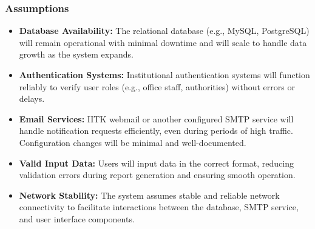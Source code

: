 \documentclass[a4paper,12pt]{article}
\begin{document}
\subsubsection{Assumptions}
    \begin{itemize}
        \item \textbf{Database Availability:} The relational database (e.g., MySQL, PostgreSQL) will remain operational with minimal downtime and will scale to handle data growth as the system expands.
        \item \textbf{Authentication Systems:} Institutional authentication systems will function reliably to verify user roles (e.g., office staff, authorities) without errors or delays.
        \item \textbf{Email Services:} IITK webmail or another configured SMTP service will handle notification requests efficiently, even during periods of high traffic. Configuration changes will be minimal and well-documented.
        \item \textbf{Valid Input Data:} Users will input data in the correct format, reducing validation errors during report generation and ensuring smooth operation.
        \item \textbf{Network Stability:} The system assumes stable and reliable network connectivity to facilitate interactions between the database, SMTP service, and user interface components.
    \end{itemize}
\end{document}
